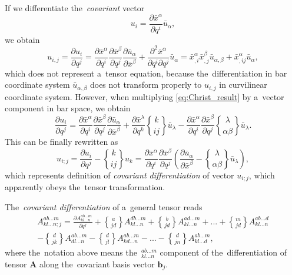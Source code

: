\documentclass[preprint,12pt]{elsarticle}
\newcommand{\pdv}[2]{\frac{\partial{#1}}{\partial{#2}}}
\newcommand{\vect}[1]{\boldsymbol{#1}}
\newcommand{\matr}[1]{\mathbf{#1}}
\newcommand{\christ}[3]{\genfrac{\{}{\}}{0pt}{}{#1}{#2 #3}}
\begin{document}
If we differentiate the~\textit{covariant} vector
\begin{equation}
  u_i = \pdv{\bar{x}^\alpha}{q^i} \bar{u}_\alpha ,
  \nonumber
\end{equation}
we obtain
\begin{equation}
  u_{i,j} = \pdv{u_i}{q^j} = 
  \pdv{\bar{x}^\alpha}{q^i}\pdv{\bar{x}^\beta}{q^j}
  \pdv{\bar{u}_\alpha}{\bar{x}^\beta} 
  + \frac{\partial^2\bar{x}^\alpha}{\partial q^i\partial q^j} 
  \bar{u}_\alpha 
  = \bar{x}^\alpha_{,i}\bar{x}^\beta_{,j}
  \bar{u}_{\alpha,\beta} 
  + \bar{x}^\alpha_{,ij} 
  \bar{u}_\alpha ,
\end{equation}
which does not represent a~tensor equation, because the~differentiation
in bar coordinate system $\bar{u}_{\alpha,\beta}$ does not transform 
properly to $u_{i,j}$ in curvilinear coordinate system. However, when
multiplying \eqref{eq:Christ_result} by a~vector component in bar space,
we obtain
\begin{equation}
  \pdv{u_i}{q^j} = 
  \pdv{\bar{x}^\alpha}{q^i}\pdv{\bar{x}^\beta}{q^j}
  \pdv{\bar{u}_\alpha}{\bar{x}^\beta} 
  + \pdv{\bar{x}^\lambda}{q^k}\christ{k}{i}{j}\bar{u}_\lambda
  - \pdv{\bar{x}^\alpha}{q^i}\pdv{\bar{x}^\beta}{q^j}
  \christ{\lambda}{\alpha}{\beta}\bar{u}_\lambda .
  \nonumber
\end{equation}
This can be finally rewritten as
\begin{equation}
  u_{i;j} = \pdv{u_i}{q^j} 
  - \christ{k}{i}{j} u_k
  = \pdv{\bar{x}^\alpha}{q^i}\pdv{\bar{x}^\beta}{q^j}
  \left(\pdv{\bar{u}_\alpha}{\bar{x}^\beta} 
  - \christ{\lambda}{\alpha}{\beta}\bar{u}_\lambda\right) ,
  \label{eq:vector_covariant_diff}
\end{equation}
which represents definition of \textit{covariant differentiation} of vector
$u_{i;j}$, which apparently obeys the~tensor transformation.

The~\textit{covariant differentiation} of a~general tensor reads
\begin{multline}
  A^{ab...m}_{kl...n;j} = \pdv{A^{ab...m}_{kl...n}}{q^j} 
  + \christ{a}{j}{d}A^{db...m}_{kl...n}
  + \christ{b}{j}{d}A^{ad...m}_{kl...n} + ...
  + \christ{m}{j}{d}A^{ab...d}_{kl...n} \\
  - \christ{d}{j}{k}A^{ab...m}_{dl...n}
  - \christ{d}{j}{l}A^{ab...m}_{kd...n} - ...
  - \christ{d}{j}{n}A^{ab...m}_{kl...d} ,
\end{multline} 
where the~notation above means 
the~$^{ab...m}_{kl...n}$ component of the~differentiation of tensor 
$\matr{A}$ along the~covariant basis vector $\vect{b}_j$.
\end{document}

